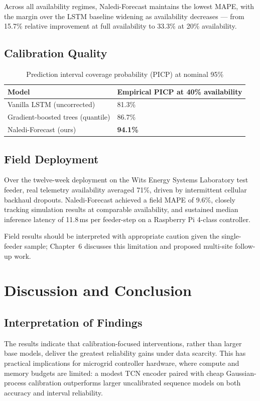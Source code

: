 \documentclass[12pt,a4paper]{report}
\begin{document}
Across all availability regimes, Naledi-Forecast maintains the lowest MAPE, with the margin
over the LSTM baseline widening as availability decreases --- from 15.7\% relative
improvement at full availability to 33.3\% at 20\% availability.

\section{Calibration Quality}
\begin{table}[htbp]
\centering
\caption{Prediction interval coverage probability (PICP) at nominal 95\%}
\label{tab:picp}
\begin{tabularx}{\linewidth}{@{}lX@{}}
\toprule
\textbf{Model} & \textbf{Empirical PICP at 40\% availability} \\
\midrule
Vanilla LSTM (uncorrected) & 81.3\% \\
Gradient-boosted trees (quantile) & 86.7\% \\
\rowcolor{witssand} Naledi-Forecast (ours) & \textbf{94.1\%} \\
\bottomrule
\end{tabularx}
\end{table}

\section{Field Deployment}
Over the twelve-week deployment on the Wits Energy Systems Laboratory test feeder, real
telemetry availability averaged 71\%, driven by intermittent cellular backhaul dropouts.
Naledi-Forecast achieved a field MAPE of 9.6\%, closely tracking simulation results at
comparable availability, and sustained median inference latency of 11.8\,ms per feeder-step
on a Raspberry Pi 4-class controller.

\begin{notebox}
Field results should be interpreted with appropriate caution given the single-feeder sample;
Chapter~6 discusses this limitation and proposed multi-site follow-up work.
\end{notebox}

\chapter{Discussion and Conclusion}

\section{Interpretation of Findings}
The results indicate that calibration-focused interventions, rather than larger base models,
deliver the greatest reliability gains under data scarcity. This has practical implications
for microgrid controller hardware, where compute and memory budgets are limited: a modest
TCN encoder paired with cheap Gaussian-process calibration outperforms larger uncalibrated
sequence models on both accuracy and interval reliability.
\end{document}
